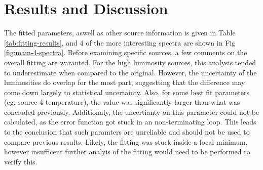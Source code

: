\documentclass[aps,
                pra,  
                a4paper, 
                amsmath, 
                amssymb, 
                preprint,
                tightenlines,  
                amsfonts,
                nofootinbib,
                notitlepage
            ]{revtex4-2}
\begin{document}
\section{Results and Discussion}
The fitted parameters, aswell as other source information is given in Table \ref{tab:fitting-results}, and 4 of the more interesting spectra are shown in Fig \ref{fig:main-4-spectra}. Before examining specific sources, a few comments on the overall fitting are waranted. For the high luminosity sources, this analysis tended to underestimate when compared to the original. However, the uncertainty of the luminosities do overlap for the most part, suggestting that the difference may come down largely to statistical uncertainty. Also, for some best fit parameters (eg. source 4 temperature), the value was significantly larger than what was concluded previously. Additionaly, the uncertianty on this parameter could not be calculated, as the {\sc error} function got stuck in an non-terminating loop. This leads to the conclusion that such paramters are unreliable and should not be used to compare previous results. Likely, the fitting was stuck inside a local minimum, however insufficent further analyis of the fitting would need to be performed to verify this. 
\vfill
\end{document}
